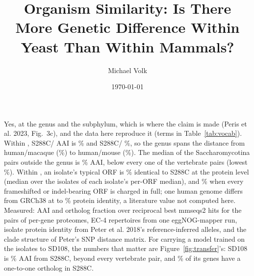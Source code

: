\documentclass[10pt,a4paper]{article}
\title{\vspace{-1.5em}Organism Similarity: Is There More Genetic Difference Within Yeast
Than Within Mammals?}
\author{Michael Volk}
\date{\today}
\begin{document}
\maketitle
\thispagestyle{empty}

\noindent
Yes, at the genus and the subphylum, which is where the claim is made (Peris et al. 2023,
Fig.~3c), and the data here reproduce it (terms in Table~\ref{tab:vocab}). Within
, S288C/ AAI is \aaiShortScerSpar\% and
S288C/ \aaiShortScerSeub\%, so the genus spans the distance from
human/macaque (\aaiShortHumMacaque\%) to human/mouse (\aaiShortHumMouse\%). The median of
the \nYcotina{} Saccharomycotina pairs outside the genus is \aaiMedianYcotina\% AAI, below
every one of the \nVertPairs{} vertebrate pairs (lowest \minVertAai\%). Within
, an isolate's typical ORF is \isoMedMedId\% identical to S288C at the
protein level (median over the \nIsolates{} isolates of each isolate's per-ORF median), and
\isoMedMeanId\% when every frameshifted or indel-bearing ORF is charged in full; one human
genome differs from GRCh38 at \litIdLo{} to \litIdHi\% protein identity, a literature value
not computed here. Measured: AAI and ortholog fraction over reciprocal best mmseqs2 hits for
the \nPairs{} pairs of \nProteomes{} per-gene proteomes, EC-4 repertoires from one
eggNOG-mapper run, isolate protein identity from Peter et al. 2018's reference-inferred
alleles, and the clade structure of Peter's SNP distance matrix. For carrying a model
trained on the isolates to  SD108, the numbers that matter are
Figure~\ref{fig:transfer}'s: SD108 is \sdAai\% AAI from S288C, beyond every vertebrate
pair, and \sdOfPct\% of its genes have a one-to-one ortholog in S288C.

\vspace{0.5em}
\tccontents
\clearpage






\end{document}
